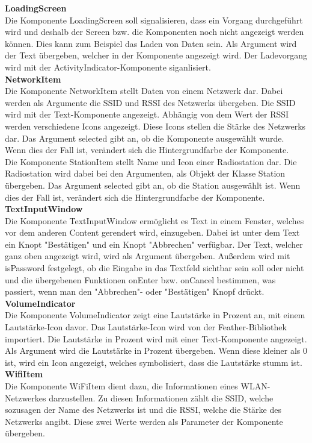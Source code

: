 \documentclass[]{article}
\begin{document}
\textbf{LoadingScreen} \\
Die Komponente LoadingScreen soll signalisieren, dass ein Vorgang durchgeführt wird und deshalb der Screen bzw. die Komponenten noch nicht angezeigt werden können. Dies kann zum Beispiel das Laden von Daten sein. Als Argument wird der Text übergeben, welcher in der Komponente angezeigt wird. Der Ladevorgang wird mit der ActivityIndicator-Komponente siganlisiert. \newline \\
\textbf{NetworkItem} \\
Die Komponente NetworkItem stellt Daten von einem Netzwerk dar. Dabei werden als Argumente die SSID und RSSI des Netzwerks übergeben. Die SSID wird mit der Text-Komponente angezeigt. Abhängig von dem Wert der RSSI werden verschiedene Icons angezeigt. Diese Icons stellen die Stärke des Netzwerks dar. Das Argument selected gibt an, ob die Komponente ausgewählt wurde. Wenn dies der Fall ist, verändert sich die Hintergrundfarbe der Komponente. \newline \\
Die Komponente StationItem stellt Name und Icon einer Radiostation dar. Die Radiostation wird dabei bei den Argumenten, als Objekt der Klasse Station übergeben. Das Argument selected gibt an, ob die Station ausgewählt ist. Wenn dies der Fall ist, verändert sich die Hintergrundfarbe der Komponente. \newline \\
\textbf{TextInputWindow} \\
Die Komponente TextInputWindow ermöglicht es Text in einem Fenster, welches vor dem anderen Content gerendert wird, einzugeben. Dabei ist unter dem Text ein Knopt "Bestätigen" und ein Knopt "Abbrechen" verfügbar. Der Text, welcher ganz oben angezeigt wird, wird als Argument übergeben. Außerdem wird mit isPassword festgelegt, ob die Eingabe in das Textfeld sichtbar sein soll oder nicht und die übergebenen Funktionen onEnter bzw. onCancel bestimmen, was passiert, wenn man den "Abbrechen"- oder "Bestätigen" Knopf drückt. \newline \\
\textbf{VolumeIndicator} \\
Die Komponente VolumeIndicator zeigt eine Lautstärke in Prozent an, mit einem Lautstärke-Icon davor. Das Lautstärke-Icon wird von der Feather-Bibliothek importiert. Die Lautstärke in Prozent wird mit einer Text-Komponente angezeigt. Als Argument wird die Lautstärke in Prozent übergeben. Wenn diese kleiner als 0 ist, wird ein Icon angezeigt, welches symbolisiert, dass die Lautstärke stumm ist. \newline \\
\textbf{WifiItem} \\
Die Komponente WiFiItem dient dazu, die Informationen eines WLAN-Netzwerkes darzustellen. Zu diesen Informationen zählt die SSID, welche sozusagen der Name des Netzwerks ist und die RSSI, welche die Stärke des Netzwerks angibt. Diese zwei Werte werden als Parameter der Komponente übergeben.
\end{document}
